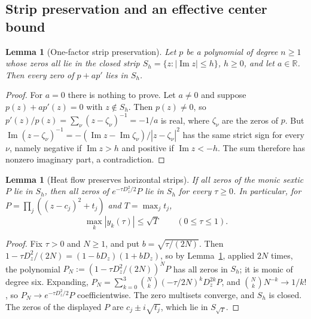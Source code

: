 \documentclass[11pt]{article}
\newtheorem{lemma}[theorem]{Lemma}
\theoremstyle{definition}
\theoremstyle{remark}
\begin{document}
\subsection{Strip preservation and an effective center bound}

\begin{lemma}[One-factor strip preservation]
\label{lem:f2v51-one-factor}
Let \(p\) be a polynomial of degree \(n\ge1\) whose zeros all lie in the
closed strip \(S_h=\{z:|\operatorname{Im}z|\le h\}\), \(h\ge0\), and let
\(a\in\mathbb R\).  Then every zero of \(p+ap'\) lies in \(S_h\).
\end{lemma}

\begin{proof}
For \(a=0\) there is nothing to prove.  Let \(a\ne0\) and suppose
\(p(z)+ap'(z)=0\) with \(z\notin S_h\).  Then \(p(z)\ne0\), so
\(p'(z)/p(z)=\sum_\nu(z-\zeta_\nu)^{-1}=-1/a\) is real, where
\(\zeta_\nu\) are the zeros of \(p\).  But
\(\operatorname{Im}(z-\zeta_\nu)^{-1}
 =-(\operatorname{Im}z-\operatorname{Im}\zeta_\nu)/|z-\zeta_\nu|^2\)
has the same strict sign for every \(\nu\), namely negative if
\(\operatorname{Im}z>h\) and positive if \(\operatorname{Im}z<-h\).
The sum therefore has nonzero imaginary part, a contradiction.
\end{proof}

\begin{lemma}[Heat flow preserves horizontal strips]
\label{lem:f2v51-strip}
If all zeros of the monic sextic \(P\) lie in \(S_h\), then all zeros of
\(e^{-\tau D_z^2/2}P\) lie in \(S_h\) for every \(\tau\ge0\).  In
particular, for \(P=\prod_j((z-c_j)^2+t_j)\) and \(T=\max_jt_j\),
\begin{equation}
 \max_k|y_k(\tau)|\le\sqrt T\qquad(0\le\tau\le1).
 \label{eq:f2v51-strip}
\end{equation}
\end{lemma}

\begin{proof}
Fix \(\tau>0\) and \(N\ge1\), and put \(b=\sqrt{\tau/(2N)}\).  Then
\(1-\tau D_z^2/(2N)=(1-bD_z)(1+bD_z)\), so by
Lemma~\ref{lem:f2v51-one-factor}, applied \(2N\) times, the polynomial
\(P_N:=(1-\tau D_z^2/(2N))^NP\) has all zeros in \(S_h\); it is monic of
degree six.  Expanding,
\(P_N=\sum_{k=0}^3\binom Nk(-\tau/2N)^kD_z^{2k}P\), and
\(\binom Nk N^{-k}\to1/k!\), so \(P_N\to e^{-\tau D_z^2/2}P\)
coefficientwise.  The zero multisets converge, and \(S_h\) is closed.
The zeros of the displayed \(P\) are \(c_j\pm i\sqrt{t_j}\), which lie in
\(S_{\sqrt T}\).
\end{proof}
\end{document}

